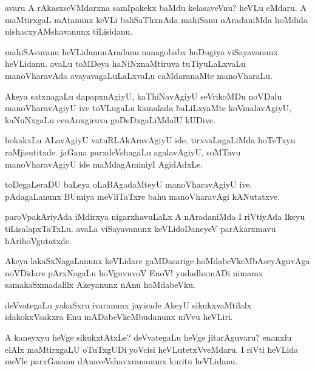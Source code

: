 \begin{mng}
avaru A rAkasxseVMdarxna samIpakekx baMdu kelasaveVnu? heVLu eMdaru. A maMtirxgaL mAtanunx keVLi baliSaThxnAda mahiSanu nAradaniMda hoMdida nishacxyAMshavanunx tiLisidanu.
\end{mng}

\begin{mng}
mahiSAsuranu heVLidanu\mdash nAradanu nanagobabx huDugiya viSayavanunx heVLidanu. avaLu toMDeya haNiNxnaMtiruva tuTiyuLaLxvaLu manoVharavAda avayavagaLuLaLxvaLu caMdaranaMte manoVharaLu.
\end{mng}

\begin{mng}
Akeya satxnagaLu dapapxnAgiyU, kaThiNavAgiyU seVrikoMDu noVDalu manoVharavAgiyU ive toVLugaLu kamalada baLiLxyaMte koVmalavAgiyU, kaNuNxgaLu cenAnxgiruva guDeDxgaLiMdalU kUDive.
\end{mng}

\begin{mng}
hokakxLu ALavAgiyU vatuRLAkAravAgiyU ide. tirxvaLagaLiMda hoTeTxyu raMjisutitxde. jaGana parxdeVshagaLu agalavAgiyU, soMTavu manoVharavAgiyU ide maMdagAminiyI AgidAdxLe.
\end{mng}

\begin{mng}
toDegaLeraDU baLeya oLaBAgadaMteyU manoVharavAgiyU ive. pAdagaLanunx BUmiya meVliTaTxre bahu manoVharavAgi kANutatxve.
\end{mng}

\begin{mng}
paroVpakAriyAda iMdirxya nigarxhavuLaLx A nAradaniMda I riVtiyAda Ikeyu tiLisalapxTaTxLu. avaLa viSayavanunx keVLidoDaneyeV parAkarxmavu hArihoVgutatxde.
\end{mng}

\begin{mng}
Akeya lakaSxNagaLanunx keVLidare gaMDasarige hoMdabeVkeMbAseyAguvAga noVDidare pArxNagaLu hoVguvuvoV EnoV! yudadhxmADi nimamx samakaSxmadalilx Akeyanunx nAnu hoMdabeVku.
\end{mng}

\begin{mng}
deVvategaLu yakaSxru ivaranunx jayisade AkeyU sikukxvaMtilalx idakokxVsakxra Enu mADabeVkeMbudanunx niVvu heVLiri.
\end{mng}

\begin{mng}
A kaneyxyu heVge sikukxtAtxLe? deVvategaLu heVge jitarAguvaru? enanxlu elAlx maMtirxgaLU oTuTxgUDi yoVcisi heVLutetxVveMdaru. I riVti heVLida meVle parxGasanu dAnaveVshavxrananunx kuritu heVLidanu.
\end{mng}


